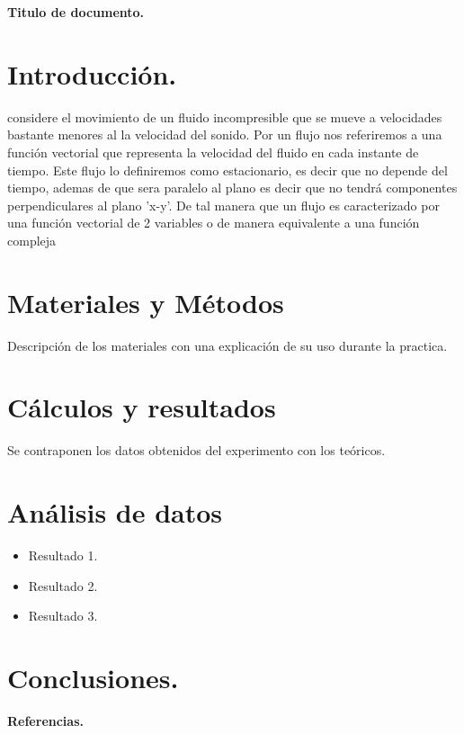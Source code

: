 \documentclass[12pt]{article}
\begin{document}
\newpage
\begin{center}
    \textbf{\Large Titulo de documento.}
    \end{center}

\section*{Introducción.}
    considere el movimiento de un fluido incompresible  que se mueve a velocidades bastante menores al la velocidad del sonido. Por un flujo nos referiremos a una función vectorial que representa la velocidad del fluido en cada instante de tiempo. Este flujo lo definiremos como estacionario, es decir que no depende del tiempo, ademas de que sera paralelo al plano es decir que no tendrá componentes perpendiculares al plano 'x-y'. De tal manera que un flujo es caracterizado por una función vectorial de 2 variables o de manera equivalente a una función compleja

\newpage	
\section*{Materiales y Métodos}

Descripción de los materiales con una explicación de su uso durante la practica.

\newpage
\section*{Cálculos y resultados}
Se contraponen los datos obtenidos del experimento con los teóricos.

\newpage
\section*{Análisis de datos}
    \begin{itemize}
        \item Resultado 1.
        \item Resultado 2.
        \item Resultado 3.      
    \end{itemize}

\newpage
\section*{Conclusiones.}

\newpage
\begin{center}
    \textbf{\Large Referencias.}
    \end{center}
\end{document}
